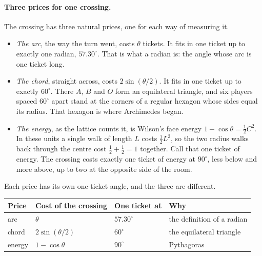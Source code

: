 \documentclass[11pt]{article}
\begin{document}
\paragraph{Three prices for one crossing.} The crossing has three natural prices, one
for each way of measuring it.
\begin{itemize}
  \item \emph{The arc}, the way the turn went, costs $\theta$ tickets. It fits in one ticket
    up to exactly one radian, $57.30^\circ$. That is what a radian is: the angle whose arc
    is one ticket long.
  \item \emph{The chord}, straight across, costs $2\sin(\theta/2)$. It fits in one ticket up
    to exactly $60^\circ$. There $A$, $B$ and $O$ form an equilateral triangle, and six
    players spaced $60^\circ$ apart stand at the corners of a regular hexagon whose sides
    equal its radius. That hexagon is where Archimedes began.
  \item \emph{The energy}, as the lattice counts it, is Wilson's face energy
    $1-\cos\theta=\tfrac12C^2$. In these units a single walk of length $L$ costs
    $\tfrac12L^2$, so the two radius walks back through the centre cost
    $\tfrac12+\tfrac12=1$ together. Call that one ticket of energy. The crossing costs
    exactly one ticket of energy at $90^\circ$, less below and more above, up to two at the
    opposite side of the room.
\end{itemize}
Each price has its own one-ticket angle, and the three are different.
\begin{center}\small
\begin{tabular}{llll}\toprule
Price & Cost of the crossing & One ticket at & Why \\ \midrule
arc & $\theta$ & $57.30^\circ$ & the definition of a radian \\
chord & $2\sin(\theta/2)$ & $60^\circ$ & the equilateral triangle \\
energy & $1-\cos\theta$ & $90^\circ$ & Pythagoras \\
\bottomrule\end{tabular}
\end{center}
\end{document}
